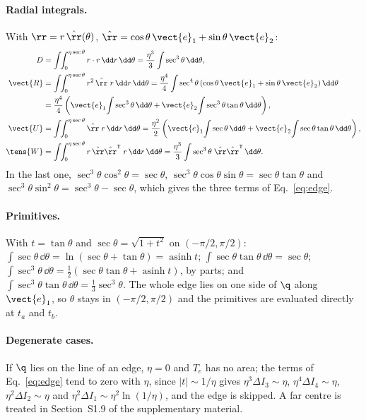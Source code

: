\paragraph{Radial integrals.} With $\rr = r\,\hat{\rr}(\theta)$,
$\hat{\rr} = \cos\theta\,\vect{e}_1 + \sin\theta\,\vect{e}_2$:
\begin{align*}
  D &= \int\!\!\int_0^{\eta\sec\theta} r\cdot r\,\dd r\,\dd\theta
     = \frac{\eta^3}{3}\int\sec^3\theta\,\dd\theta ,\\
  \vect{R} &= \int\!\!\int_0^{\eta\sec\theta} r^2\,\hat{\rr}\; r\,\dd r\,\dd\theta
     = \frac{\eta^4}{4}\int\sec^4\theta\,(\cos\theta\,\vect{e}_1 + \sin\theta\,\vect{e}_2)\,\dd\theta\\
    &= \frac{\eta^4}{4}\left(\vect{e}_1\!\int\sec^3\theta\,\dd\theta
        + \vect{e}_2\!\int\sec^3\theta\tan\theta\,\dd\theta\right),\\
  \vect{U} &= \int\!\!\int_0^{\eta\sec\theta} \hat{\rr}\; r\,\dd r\,\dd\theta
     = \frac{\eta^2}{2}\left(\vect{e}_1\!\int\sec\theta\,\dd\theta
        + \vect{e}_2\!\int\sec\theta\tan\theta\,\dd\theta\right),\\
  \tens{W} &= \int\!\!\int_0^{\eta\sec\theta} r\,\hat{\rr}\hat{\rr}^{\mathsf T}\; r\,\dd r\,\dd\theta
     = \frac{\eta^3}{3}\int\sec^3\theta\;\hat{\rr}\hat{\rr}^{\mathsf T}\,\dd\theta .
\end{align*}
In the last one, $\sec^3\theta\cos^2\theta = \sec\theta$,
$\sec^3\theta\cos\theta\sin\theta = \sec\theta\tan\theta$ and
$\sec^3\theta\sin^2\theta = \sec^3\theta - \sec\theta$, which gives the three terms of
Eq.~\eqref{eq:edge}.

\paragraph{Primitives.} With $t = \tan\theta$ and $\sec\theta = \sqrt{1+t^2}$ on
$(-\pi/2, \pi/2)$: $\int\sec\theta\,\dd\theta = \ln(\sec\theta + \tan\theta) =
\operatorname{asinh} t$; $\int\sec\theta\tan\theta\,\dd\theta = \sec\theta$;
$\int\sec^3\theta\,\dd\theta = \tfrac12(\sec\theta\tan\theta + \operatorname{asinh} t)$, by parts;
and $\int\sec^3\theta\tan\theta\,\dd\theta = \tfrac13\sec^3\theta$. The whole edge lies on one
side of $\q$ along $\vect{e}_1$, so $\theta$ stays in $(-\pi/2, \pi/2)$ and the primitives are
evaluated directly at $t_a$ and $t_b$.

\paragraph{Degenerate cases.} If $\q$ lies on the line of an edge, $\eta = 0$ and $T_e$ has no
area; the terms of Eq.~\eqref{eq:edge} tend to zero with $\eta$, since $|t|\sim 1/\eta$ gives
$\eta^3\Delta I_3\sim \eta$, $\eta^4\Delta I_4\sim \eta$, $\eta^2\Delta I_2\sim \eta$ and
$\eta^2\Delta I_1\sim \eta^2\ln(1/\eta)$, and the edge is skipped. A far centre is treated in
Section~S1.9 of the supplementary material.

